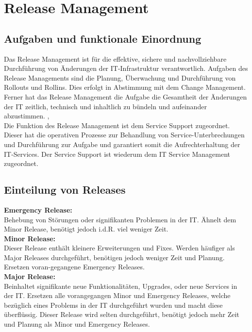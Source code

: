 \chapter{Release Management}
\section{Aufgaben und funktionale Einordnung}
Das Release Management ist für die effektive, sichere und nachvollziehbare Durchführung von Änderungen der IT-Infrastruktur verantwortlich. Aufgaben des Release Managements sind die Planung, Überwachung und Durchführung von Rollouts und Rollins. Dies erfolgt in Abstimmung mit dem Change Management.  Ferner hat das Release Management die Aufgabe die Gesamtheit der Änderungen der IT zeitlich, technisch und inhaltlich zu bündeln und aufeinander abzustimmen. \cite{wiki-it}, \cite{rm-pilorget}
\\
Die Funktion des Release Management ist dem Service Support zugeordnet. Dieser hat die operativen Prozesse zur Behandlung von Service-Unterbrechungen und Durchführung zur Aufgabe und garantiert somit die Aufrechterhaltung der IT-Services. Der Service Support ist wiederum dem IT Service Management zugeordnet.  \cite{wiki-it-service}

\section{Einteilung von Releases}
\textbf{Emergency Release:}
\\
Behebung von Störungen oder signifikanten Problemen in der IT. Ähnelt dem Minor Release, benötigt jedoch \acs{i.d.R.} viel weniger Zeit.
\\
\textbf{Minor Release:}
\\
Dieser Release enthält kleinere Erweiterungen und Fixes. Werden häufiger als Major Releases durchgeführt, benötigen jedoch weniger Zeit und Planung. Ersetzen voran-gegangene Emergency Releases. 
\\
\textbf{Major Release:}
\\
Beinhaltet signifikante neue Funktionalitäten, Upgrades, oder neue Services in der IT. Ersetzen alle vorangegangen Minor und Emergency Releases, welche bezüglich eines Problems in der IT durchgeführt wurden und macht diese überflüssig. Dieser Release wird selten durchgeführt, benötigt jedoch mehr Zeit und Planung als Minor und Emergency Releases.
\cite{rm-howard}
